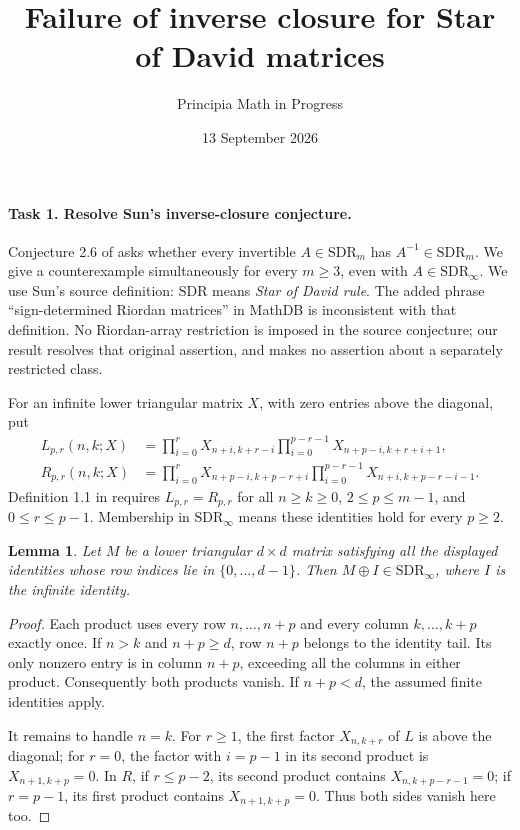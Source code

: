 \documentclass[10pt]{article}
\title{Failure of inverse closure for Star of David matrices}
\author{Principia Math in Progress}
\date{13 September 2026}
\newtheorem{lemma}{Lemma}
\newcommand{\SDR}{\mathrm{SDR}}
\begin{document}
\maketitle

\paragraph{Task 1. Resolve Sun's inverse-closure conjecture.}
Conjecture 2.6 of \cite{Sun} asks whether every invertible \(A\in\SDR_m\) has \(A^{-1}\in\SDR_m\). We give a counterexample simultaneously for every \(m\ge3\), even with \(A\in\SDR_\infty\).
We use Sun's source definition: \(\SDR\) means \emph{Star of David rule}.
The added phrase ``sign-determined Riordan matrices'' in MathDB is
inconsistent with that definition. No Riordan-array restriction is
imposed in the source conjecture; our result resolves that original
assertion, and makes no assertion about a separately restricted class.

For an infinite lower triangular matrix \(X\), with zero entries above
the diagonal, put
\begin{align*}
 L_{p,r}(n,k;X)&=
 \prod_{i=0}^{r}X_{n+i,k+r-i}
 \prod_{i=0}^{p-r-1}X_{n+p-i,k+r+i+1},\\
 R_{p,r}(n,k;X)&=
 \prod_{i=0}^{r}X_{n+p-i,k+p-r+i}
 \prod_{i=0}^{p-r-1}X_{n+i,k+p-r-i-1}.
\end{align*}
Definition 1.1 in \cite{Sun} requires \(L_{p,r}=R_{p,r}\) for all
\(n\ge k\ge0\), \(2\le p\le m-1\), and \(0\le r\le p-1\).
Membership in \(\SDR_\infty\) means these identities hold for every
\(p\ge2\).

\begin{lemma}\label{extension}
Let \(M\) be a lower triangular \(d\times d\) matrix satisfying all
the displayed identities whose row indices lie in \(\{0,\ldots,d-1\}\).
Then \(M\oplus I\in\SDR_\infty\), where \(I\) is the infinite identity.
\end{lemma}
\begin{proof}
Each product uses every row \(n,\ldots,n+p\) and every column
\(k,\ldots,k+p\) exactly once. If \(n>k\) and \(n+p\ge d\),
row \(n+p\) belongs to the identity tail. Its only nonzero entry is
in column \(n+p\), exceeding all the columns in either product.
Consequently both products vanish. If \(n+p<d\), the assumed
finite identities apply.

It remains to handle \(n=k\). For \(r\ge1\), the first factor
\(X_{n,k+r}\) of \(L\) is above the diagonal; for \(r=0\),
the factor with \(i=p-1\) in its second product is
\(X_{n+1,k+p}=0\). In \(R\), if \(r\le p-2\), its second
product contains \(X_{n,k+p-r-1}=0\); if \(r=p-1\), its first
product contains \(X_{n+1,k+p}=0\). Thus both sides vanish here too.
\end{proof}
\end{document}
